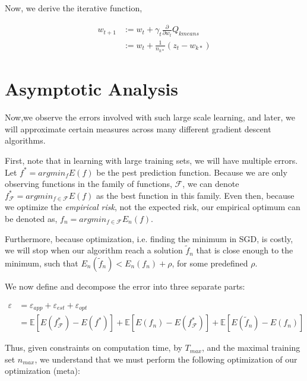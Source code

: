 \documentclass[twoside]{article}
\theoremstyle{definition}
\theoremstyle{definition}
\theoremstyle{remark}
\begin{document}
Now, we derive the iterative function, 

\begin{equation}
\begin{split}
 w_{t+1} & := w_t + \gamma_t \frac{\partial }{\partial w_t} Q_{kmeans} \\
 & :=  w_t + \frac{1}{n_{k*}} (z_t - w_{k*})
\end{split}
\end{equation}

\section{Asymptotic Analysis}

Now,we observe the errors involved with such large scale learning, and later, we will approximate certain measures across many different gradient descent algorithms.

First, note that in learning with large training sets, we will have multiple errors. Let $f^* = arg min_f E(f)$ be the pest prediction function. Because we are only observing functions in the family of functions, $\mathcal{F}$, we can denote $f^*_{\mathcal{F}} = arg min_{f \in \mathcal{F}} E(f)$ as the best function in this family. Even then, because we optimize the \emph{empirical risk}, not the expected risk, our empirical optimum can be denoted as, $f_n = arg min_{f \in \mathcal{F}} E_n(f)$.

Furthermore, because optimization, i.e. finding the minimum in SGD, is costly, we will stop when our algorithm reach a solution $\tilde{f}_n$ that is close enough to the minimum, such that $E_n(\tilde{f}_n) < E_n(f_n) + \rho$, for some predefined $\rho$.

We now define and decompose the error into three separate parts:

\begin{equation}
\begin{split}
 \varepsilon & = \varepsilon_{app}  + \varepsilon_{est} + \varepsilon_{opt} \\
 & =  \mathbb{E}[E(f^*_{\mathcal{F}}) - E(f^*)]  +  \mathbb{E}[E(f_n) - E(f^*_{\mathcal{F}})] + \mathbb{E}[E(\tilde{f}_n) - E(f_n)]
\end{split}
\end{equation}

Thus, given constraints on computation time, by $T_{max}$, and the maximal training set $n_{max}$, we understand that we must perform the following optimization of our optimization (meta):
\end{document}
